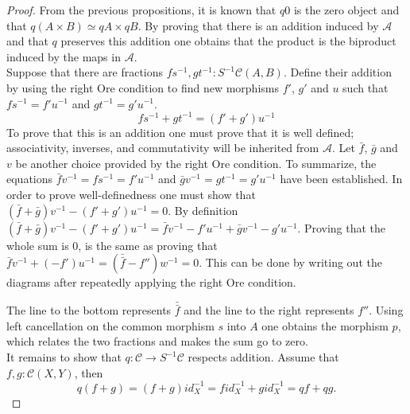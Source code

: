     \begin{proof}
        From the previous propositions, it is known that $q0$ is the zero object and that $q(A\times B)\simeq qA\times qB$. By proving that there is an addition induced by $\mathcal{A}$ and that $q$ preserves this addition one obtains that the product is the biproduct induced by the maps in $\mathcal{A}$. \\

        Suppose that there are fractions $fs^{-1}, gt^{-1}:S^{-1}\mathcal{C}(A,B)$. Define their addition by using the right Ore condition to find new morphisms $f'$, $g'$ and $u$ such that $fs^{-1} = f'u^{-1}$ and $gt^{-1} = g'u^{-1}$.
        \begin{equation*}
            fs^{-1}+gt^{-1} = (f'+g')u^{-1}
        \end{equation*}
        To prove that this is an addition one must prove that it is well defined; associativity, inverses, and commutativity will be inherited from $\mathcal{A}$.
        Let $\bar{f}$, $\bar{g}$ and $v$ be another choice provided by the right Ore condition. To summarize, the equations $\bar{f}v^{-1}=fs^{-1}=f'u^{-1}$ and $\bar{g}v^{-1}=gt^{-1}=g'u^{-1}$ have been established. In order to prove well-definedness one must show that $(\bar{f}+\bar{g})v^{-1}-(f'+g')u^{-1}=0$. By definition $(\bar{f}+\bar{g})v^{-1}-(f'+g')u^{-1}=\bar{f}v^{-1}-f'u^{-1}+\bar{g}v^{-1}-g'u^{-1}$. Proving that the whole sum is $0$, is the same as proving that $\bar{f}v^{-1}+(-f')u^{-1}=(\bar{\bar{f}}-f'')w^{-1}=0$. This can be done by writing out the diagrams after repeatedly applying the right Ore condition.
        \begin{center}
        \end{center}
        The line to the bottom represents $\bar{\bar{f}}$ and the line to the right represents $f''$. Using left cancellation on the common morphism $s$ into $A$ one obtains the morphism $p$, which relates the two fractions and makes the sum go to zero. \\

        It remains to show that $q:\mathcal{C}\rightarrow S^{-1}\mathcal{C}$ respects addition. Assume that $f,g:\mathcal{C}(X,Y)$, then
        \begin{equation*}
            q(f+g)=(f+g)id_X^{-1}=fid_X^{-1}+gid_X^{-1}=qf+qg.
        \end{equation*}
    \end{proof}

